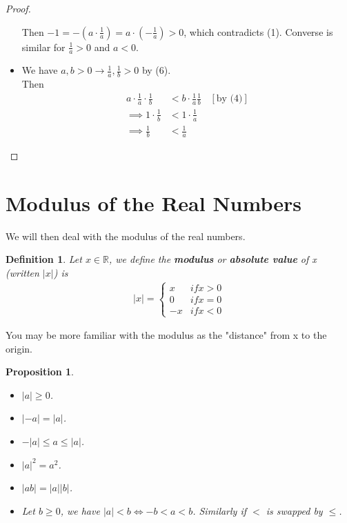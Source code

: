 \documentclass{book}
\newtheorem{definition}[theorem]{Definition}
\newtheorem{proposition}[theorem]{Proposition}
\begin{document}
\begin{proof}
\begin{itemize}[itemsep = 0pt]
        Then $-1 = -(a \cdot \frac{1}{a}) = a \cdot (-\frac{1}{a}) > 0$, which contradicts (1).
        Converse is similar for $\frac{1}{a} > 0$ and $a < 0$.
        \item[(7)] We have $a, b > 0 \rightarrow \frac{1}{a}, \frac{1}{b} > 0$ by (6). \\
        Then
        \begin{align*}
            a \cdot \frac{1}{a} \cdot \frac{1}{b} & < b \cdot \frac{1}{a} \frac{1}{b} \ \ \ \ [\text{by (4)}] \\
            \implies 1 \cdot \frac{1}{b} & < 1 \cdot \frac{1}{a} \\
            \implies \frac{1}{b} & < \frac{1}{a}
        \end{align*}
    \end{itemize}
\end{proof}

\section{Modulus of the Real Numbers}

We will then deal with the modulus of the real numbers.

\begin{definition}
    Let $x \in \mathbb{R}$, we define the \textbf{modulus} or \textbf{absolute value} of x (written $|x|$) is
    \begin{align*}
        |x| =
        \begin{cases}
            x & if x > 0 \\
            0 & if x = 0 \\
            -x & if x < 0
        \end{cases}
    \end{align*}
\end{definition}

You may be more familiar with the modulus as the "distance" from x to the origin.

\begin{proposition} \label{Proposition 1.7.2}
    \begin{itemize}[itemsep = 0pt]
        \item[(1)] $|a| \geq 0$.
        \item[(2)] $|-a| = |a|$.
        \item[(3)] $-|a| \leq a \leq |a|$.
        \item[(4)] $|a|^{2} = a^{2}$.
        \item[(5)] $|ab| = |a||b|$.
        \item[(6)] Let $b \geq 0$, we have $|a| < b \iff -b < a < b$. Similarly if $<$ is swapped by $\leq$.
    \end{itemize}
\end{proposition}
\end{document}
